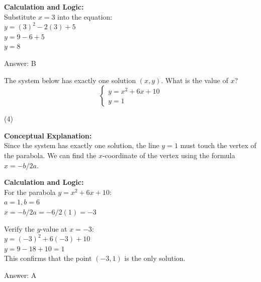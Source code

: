 \documentclass[11pt,paper=a4,answers]{exam}
\begin{document}
\begin{questions}
\begin{solution}
\vspace{20pt}

\textbf{Calculation and Logic:} \\
Substitute $x = 3$ into the equation: \\
$y = (3)^2 - 2(3) + 5$ \\
$y = 9 - 6 + 5$ \\
$y = 8$

\vspace{25pt}

Answer: \colorbox{yellow!100}{B}
\end{solution}

\vspace{40pt}

\question
The system below has exactly one solution $(x, y)$. What is the value of $x$?
\[ \begin{cases} y = x^2 + 6x + 10 \\ y = 1 \end{cases} \]
\begin{tasks}(4)
\end{tasks}

\begin{solution}
\textbf{Conceptual Explanation:} \\
Since the system has exactly one solution, the line $y = 1$ must touch the vertex of the parabola. We can find the $x$-coordinate of the vertex using the formula $x = -b/2a$.

\vspace{20pt}

\textbf{Calculation and Logic:} \\
For the parabola $y = x^2 + 6x + 10$: \\
$a = 1, b = 6$ \\
$x = -b/2a = -6 / 2(1) = -3$

\vspace{10pt}

Verify the $y$-value at $x = -3$: \\
$y = (-3)^2 + 6(-3) + 10$ \\
$y = 9 - 18 + 10 = 1$ \\
This confirms that the point $(-3, 1)$ is the only solution.

\vspace{25pt}

Answer: \colorbox{yellow!100}{A}
\end{solution}


\end{questions}
\end{document}
